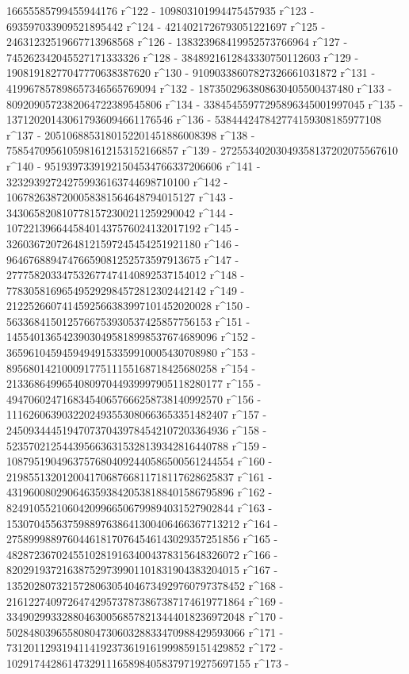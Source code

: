        16655585799455944176 r^122 - 109803101994475457935 r^123 - 
       693597033909521895442 r^124 - 4214021726793051221697 r^125 - 
       24631232519667713968568 r^126 - 
       138323968419952573766964 r^127 - 
       745262342045527171333326 r^128 - 
       3848921612843330750112603 r^129 - 
       19081918277047770638387620 r^130 - 
       91090338607827326661031872 r^131 - 
       419967857898657346565769094 r^132 - 
       1873502963808630405500437480 r^133 - 
       8092090572382064722389545806 r^134 - 
       33845455977295896345001997045 r^135 - 
       137120201430617936094661176546 r^136 - 
       538444247842774159308185977108 r^137 - 
       2051068853180152201451886008398 r^138 - 
       7585470956105981612153152166857 r^139 - 
       27255340203049358137202075567610 r^140 - 
       95193973391921504534766337206606 r^141 - 
       323293927242759936163744698710100 r^142 - 
       1067826387200058381564648794015127 r^143 - 
       3430658208107781572300211259290042 r^144 - 
       10722139664458401437576024132017192 r^145 - 
       32603672072648121597245454251921180 r^146 - 
       96467688947476659081252573597913675 r^147 - 
       277758203347532677474140892537154012 r^148 - 
       778305816965495292984572812302442142 r^149 - 
       2122526607414592566383997101452020028 r^150 - 
       5633684150125766753930537425857756153 r^151 - 
       14554013654239030495818998537674689096 r^152 - 
       36596104594594949153359910005430708980 r^153 - 
       89568014210009177511155168718425680258 r^154 - 
       213368649965408097044939997905118280177 r^155 - 
       494706024716834540657666258738140992570 r^156 - 
       1116260639032202493553080663653351482407 r^157 - 
       2450934445194707370439784542107203364936 r^158 - 
       5235702125443956636315328139342816440788 r^159 - 
       10879519049637576804092440586500561244554 r^160 - 
       21985513201200417068766811718117628625837 r^161 - 
       43196008029064635938420538188401586795896 r^162 - 
       82491055210604209966506799894031527902844 r^163 - 
       153070455637598897638641300406466367713212 r^164 - 
       275899988976044618170764546143029357251856 r^165 - 
       482872367024551028191634004378315648326072 r^166 - 
       820291937216387529739901101831904383204015 r^167 - 
       1352028073215728063054046734929760797378452 r^168 - 
       2161227409726474295737873867387174619771864 r^169 - 
       3349029933288046300568578213444018236972048 r^170 - 
       5028480396558080473060328833470988429593066 r^171 - 
       7312011293194114192373619161999859151429852 r^172 - 
       10291744286147329111658984058379719275697155 r^173 - 
